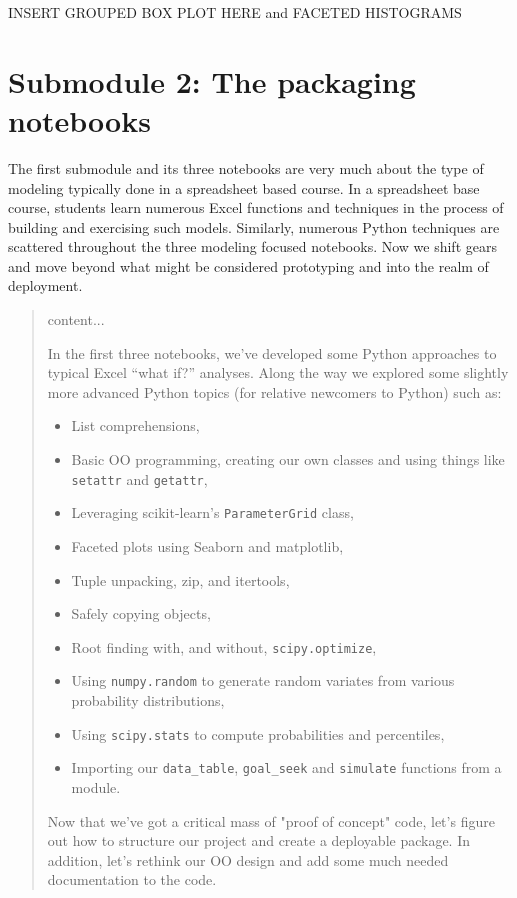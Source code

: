 \documentclass[ited,blindrev]{informs3}              %
\begin{document}
INSERT GROUPED BOX PLOT HERE and FACETED HISTOGRAMS

\section{Submodule 2: The packaging notebooks}

The first submodule and its three notebooks are very much about the type of modeling typically done in a spreadsheet based course. In a spreadsheet base course, students learn numerous Excel functions and techniques in the process of building and exercising such models. Similarly, numerous Python techniques are scattered throughout the three modeling focused notebooks. Now we shift gears and move beyond what might be considered prototyping and into the realm of deployment. 

\begin{quote}
	content...

In the first three notebooks, we've developed some Python approaches to
typical Excel ``what if?'' analyses. Along the way we explored some
slightly more advanced Python topics (for relative newcomers to Python)
such as:

\begin{itemize}
	\tightlist
	\item
	List comprehensions,
	\item
	Basic OO programming, creating our own classes and using things like
	\texttt{setattr} and \texttt{getattr},
	\item
	Leveraging scikit-learn's \texttt{ParameterGrid} class,
	\item
	Faceted plots using Seaborn and matplotlib,
	\item
	Tuple unpacking, zip, and itertools,
	\item
	Safely copying objects,
	\item
	Root finding with, and without, \texttt{scipy.optimize},
	\item
	Using \texttt{numpy.random} to generate random variates from various
	probability distributions,
	\item
	Using \texttt{scipy.stats} to compute probabilities and percentiles,
	\item
	Importing our \texttt{data\_table}, \texttt{goal\_seek} and
	\texttt{simulate} functions from a module.
\end{itemize}

Now that we've got a critical mass of "proof of concept" code, let's figure out how to structure our project and create a deployable package. In addition, let's rethink our OO design and add some much needed documentation to the code.
\end{quote}
\end{document}
